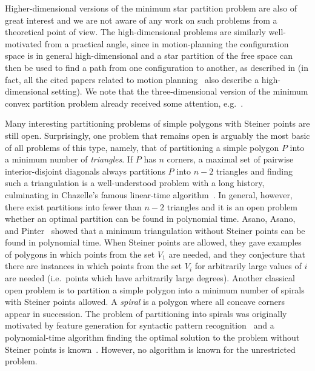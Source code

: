 \documentclass{theoretics}
\begin{document}
Higher-dimensional versions of the minimum star partition problem are also of great interest and we are not aware of any work on such problems from a theoretical point of view.
The high-dimensional problems are similarly well-motivated from a practical angle, since in motion-planning the configuration space is in general high-dimensional and a star partition of the free space can then be used to find a path from one configuration to another, as described in  (in fact, all the cited papers related to motion planning~\cite{varadhan2005star,dobson2014sparse, SPBG:SPBG07:073-080, lien2009planning, zhang2006fast} also describe a high-dimensional setting).
We note that the three-dimensional version of the minimum convex partition problem already received some attention, e.g.~\cite{DBLP:journals/algorithmica/ChazelleP97,DBLP:journals/siamcomp/BajajD92,DBLP:journals/siamcomp/Chazelle84}.

Many interesting partitioning problems of simple polygons with Steiner points are still open.
Surprisingly, one problem that remains open is arguably the most basic of all problems of this type, namely, that of partitioning a simple polygon $P$ into a minimum number of \emph{triangles}.
If $P$ has $n$ corners, a maximal set of pairwise interior-disjoint diagonals always partitions $P$ into $n-2$ triangles and finding such a triangulation is a well-understood problem with a long history, culminating in Chazelle's famous linear-time algorithm~\cite{DBLP:journals/dcg/Chazelle91}.
In general, however, there exist partitions into fewer than $n-2$ triangles and it is an open problem whether an optimal partition can be found in polynomial time.
Asano, Asano, and Pinter~\cite{DBLP:journals/jal/AsanoAP86} showed that a minimum triangulation without Steiner points can be found in polynomial time.
When Steiner points are allowed, they gave examples of polygons in which points from the set $V_1$ are needed, and they conjecture that there are instances in which points from the set $V_i$ for arbitrarily large values of $i$ are needed (i.e.\ points which have arbitrarily large degrees).
Another classical open problem is to partition a simple polygon into a minimum number of spirals with Steiner points allowed.
A \emph{spiral} is a polygon where all concave corners appear in succession.
The problem of partitioning into spirals was originally motivated by feature generation for syntactic pattern recognition~\cite{DBLP:journals/tc/FengP75} and a polynomial-time algorithm finding the optimal solution to the problem without Steiner points is known~\cite{DBLP:journals/siamcomp/Keil85}. However, no algorithm is known for the unrestricted problem.
\end{document}
